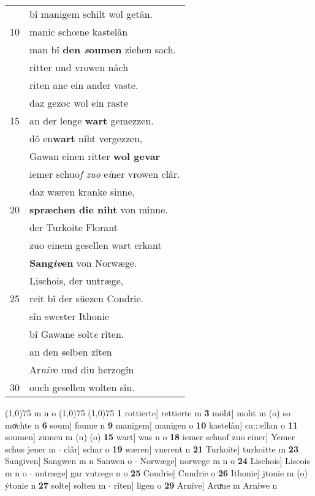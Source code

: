 \documentclass[8pt,a4paper,notitlepage]{article}
\begin{document}
\begin{table}[ht]
\begin{minipage}[t]{0.5\linewidth}
\begin{tabular}{rl}
 & bî manigem schilt wol getân.\\ 
10 & manic schœne kastelân\\ 
 & man bî \textbf{den \textit{s}oumen} ziehen sach.\\ 
 & ritter und vrowen nâch\\ 
 & riten ane ein ander vaste.\\ 
 & daz gezoc wol ein raste\\ 
15 & an der lenge \textbf{wart} gemezzen.\\ 
 & dô en\textbf{wart} niht vergezzen,\\ 
 & Gawan einen ritter \textbf{wol gevar}\\ 
 & iemer schuo\textit{f zuo }e\textit{i}ner vrowen clâr.\\ 
 & daz wæren kranke sinne,\\ 
20 & \textbf{spræchen die niht} von minne.\\ 
 & der Turkoite Florant\\ 
 & zuo einem gesellen wart erkant\\ 
 & \textbf{Sang\textit{iv}en} von Norwæge.\\ 
 & Lischois, der untræge,\\ 
25 & reit bî der süezen Condrie.\\ 
 & sîn swester Ithonie\\ 
 & bî Gawane solt\textit{e} rîten.\\ 
 & an den selben zîten\\ 
 & Ar\textit{niv}e und diu herzogîn\\ 
30 & ouch gesellen wolten sîn.\\ 
\end{tabular}
\scriptsize
\line(1,0){75} \newline
m n o \newline
\line(1,0){75} \newline
\newline
\line(1,0){75} \newline
\textbf{1} rottierte] rettierte m \textbf{3} möht] moht m (o) so moͯchte n \textbf{6} soum] foume n \textbf{9} manigem] manigen o \textbf{10} kastelân] ca:::ellan o \textbf{11} soumen] zumen m (n) (o) \textbf{15} wart] was n o \textbf{18} iemer schuof zuo einer] Yemer schus jener m  $\cdot$ clâr] schar o \textbf{19} wæren] vnerent n \textbf{21} Turkoite] turkoitte m \textbf{23} Sangiven] Sangwen m n Sanwen o  $\cdot$ Norwæge] norwege m n o \textbf{24} Lischois] Liscois m n o  $\cdot$ untræge] gar vntrege n o \textbf{25} Condrie] Cundrie o \textbf{26} Ithonie] jtonie m (o) ẏtonie n \textbf{27} solte] solten m  $\cdot$ rîten] ligen o \textbf{29} Arnive] Aruͯne m Arniwe n \newline
\end{minipage}
\end{table}
\end{document}
